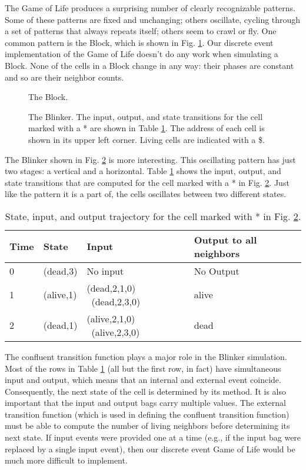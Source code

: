 The Game of Life produces a surprising number of clearly recognizable patterns. Some of these patterns are fixed and unchanging; others oscillate, cycling through a set of patterns that always repeats itself; others seem to crawl or fly. One common pattern is the Block, which is shown in Fig. \ref{fig:gol_block}. Our discrete event implementation of the Game of Life doesn't do any work when simulating a Block. None of the cells in a Block change in any way: their phases are constant and so are their neighbor counts.
\begin{figure}[ht]
\centering
{}
\caption{The Block.}
\label{fig:gol_block}
\end{figure}
\begin{figure}[ht]
\centering
{}
\caption{The Blinker. The input, output, and state transitions for the cell marked with a * are shown in Table \ref{tab:blinker_cell_activity}. The address of each cell is shown in its upper left corner. Living cells are indicated with a \$.}
\label{fig:gol_blinker}
\end{figure}
The Blinker shown in Fig. \ref{fig:gol_blinker} is more interesting. This oscillating pattern has just two stages: a vertical and a horizontal. Table \ref{tab:blinker_cell_activity} shows the input, output, and state transitions that are computed for the cell marked with a * in Fig. \ref{fig:gol_blinker}. Just like the pattern it is a part of, the cells oscillates between two different states. 
\begin{table}[ht]
\centering
\begin{tabular}{|l|l|l|l|}
\hline Time & State      & Input & Output to all neighbors\\ \hline
0 & (dead,3) & No input & No Output \\ \hline 
1 & (alive,1) & (dead,2,1,0) \ (dead,2,3,0) & alive \\ \hline 
2 & (dead,1) & (alive,2,1,0) \ (alive,2,3,0) & dead \\ \hline
\end{tabular}
\caption{State, input, and output trajectory for the cell marked with * in Fig. \ref{fig:gol_blinker}.}
\label{tab:blinker_cell_activity}
\end{table}

The confluent transition function plays a major role in the Blinker simulation. Most of the rows in Table \ref{tab:blinker_cell_activity} (all but the first row, in fact) have simultaneous input and output, which means that an internal and external event coincide. Consequently, the next state of the cell is determined by its  method. It is also important that the input and output bags carry multiple values. The external transition function (which is used in defining the confluent transition function) must be able to compute the number of living neighbors before determining its next state. If input events were provided one at a time (e.g., if the input bag were replaced by a single input event), then our discrete event Game of Life would be much more difficult to implement.
